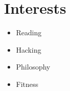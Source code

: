 \section*{Interests}
\begin{itemize}
  \item Reading
  \item Hacking
  \item Philosophy
  \item Fitness
\end{itemize}
